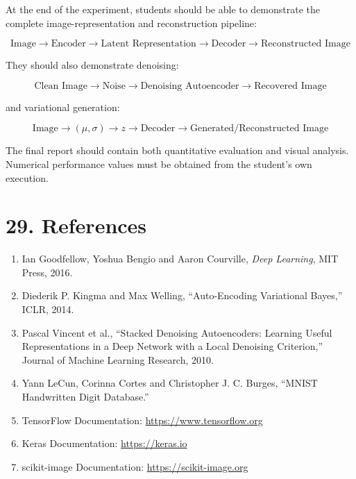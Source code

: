 \documentclass[10pt]{article}
\begin{document}
At the end of the experiment, students should be able to demonstrate the
complete image-representation and reconstruction pipeline:

\[
\boxed{
\text{Image}
\rightarrow
\text{Encoder}
\rightarrow
\text{Latent Representation}
\rightarrow
\text{Decoder}
\rightarrow
\text{Reconstructed Image}
}
\]

They should also demonstrate denoising:

\[
\boxed{
\text{Clean Image}
\rightarrow
\text{Noise}
\rightarrow
\text{Denoising Autoencoder}
\rightarrow
\text{Recovered Image}
}
\]

and variational generation:

\[
\boxed{
\text{Image}
\rightarrow
(\mu,\sigma)
\rightarrow
z
\rightarrow
\text{Decoder}
\rightarrow
\text{Generated/Reconstructed Image}
}
\]

The final report should contain both quantitative evaluation and visual
analysis. Numerical performance values must be obtained from the student's
own execution.

\section*{29. References}

\begin{enumerate}
\item Ian Goodfellow, Yoshua Bengio and Aaron Courville,
\emph{Deep Learning}, MIT Press, 2016.

\item Diederik P. Kingma and Max Welling,
``Auto-Encoding Variational Bayes,'' ICLR, 2014.

\item Pascal Vincent et al.,
``Stacked Denoising Autoencoders: Learning Useful Representations in a Deep
Network with a Local Denoising Criterion,'' Journal of Machine Learning
Research, 2010.

\item Yann LeCun, Corinna Cortes and Christopher J. C. Burges,
``MNIST Handwritten Digit Database.''

\item TensorFlow Documentation:
\url{https://www.tensorflow.org}

\item Keras Documentation:
\url{https://keras.io}

\item scikit-image Documentation:
\url{https://scikit-image.org}
\end{enumerate}
\end{document}
